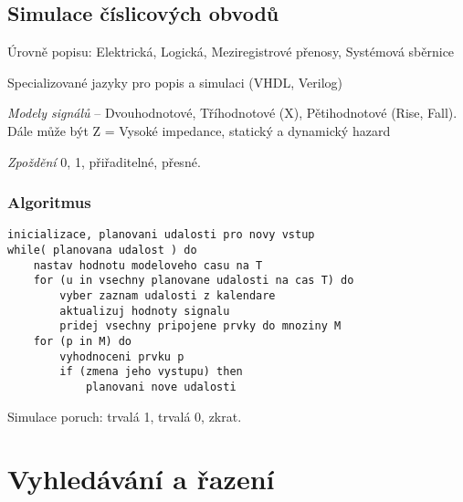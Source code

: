 \documentclass[a4paper, 11pt]{report}
\begin{document}
\section{Simulace číslicových obvodů}

Úrovně popisu: Elektrická, Logická, Meziregistrové přenosy, Systémová sběrnice

Specializované jazyky pro popis a simulaci (VHDL, Verilog)

\emph{Modely signálů} -- Dvouhodnotové, Tříhodnotové (X), Pětihodnotové (Rise, Fall). Dále může být Z = Vysoké impedance, statický a dynamický hazard

\emph{Zpoždění} 0, 1, přiřaditelné, přesné.

\subsection{Algoritmus}

\begin{lstlisting}
inicializace, planovani udalosti pro novy vstup
while( planovana udalost ) do
	nastav hodnotu modeloveho casu na T
	for (u in vsechny planovane udalosti na cas T) do
		vyber zaznam udalosti z kalendare
		aktualizuj hodnoty signalu
		pridej vsechny pripojene prvky do mnoziny M
	for (p in M) do
		vyhodnoceni prvku p
		if (zmena jeho vystupu) then
			planovani nove udalosti
\end{lstlisting}

Simulace poruch: trvalá 1, trvalá 0, zkrat.





























\setcounter{chapter}{26}
\chapter{Vyhledávání a řazení} \label{cha:27}
\end{document}
